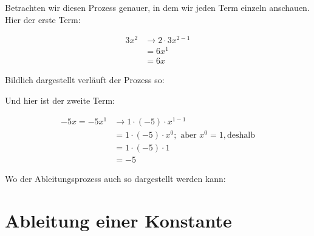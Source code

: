 \documentclass{scrartcl}
\begin{document}
Betrachten wir diesen Prozess genauer, in dem wir jeden Term einzeln
anschauen.  Hier der erste Term:

\begin{align}
    3x^2 & \rightarrow 2 \cdot 3 x^{2 - 1}\\
    & = 6 x^1\\
    & = 6 x
\end{align}

Bildlich dargestellt verläuft der Prozess so:

\begin{center}
\end{center}

Und hier ist der zweite Term:

\begin{align}
    -5x = -5x^1 & \rightarrow 1 \cdot (-5) \cdot x^{1 - 1}\\
    & = 1 \cdot (-5) \cdot x^0; \text{ aber } x^0 = 1, \text{deshalb}\\
    & = 1 \cdot (-5) \cdot 1\\
    & = -5
\end{align}

Wo der Ableitungsprozess auch so dargestellt werden kann:

\begin{center}
\end{center}

\section{Ableitung einer Konstante}
\label{sec:ableitung-konstante}
\end{document}
